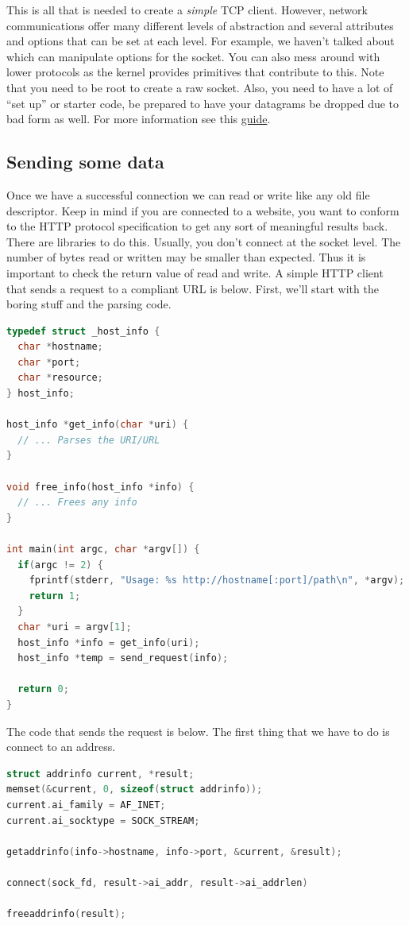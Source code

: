This is all that is needed to create a \textit{simple} TCP client.
However, network communications offer many different levels of abstraction and several attributes and options that can be set at each level.
For example, we haven't talked about  which can manipulate options for the socket.
You can also mess around with lower protocols as the kernel provides primitives that contribute to this.
Note that you need to be root to create a raw socket.
Also, you need to have a lot of ``set up'' or starter code, be prepared to have your datagrams be dropped due to bad form as well.
For more information see this \href{http://www.beej.us/guide/bgnet/output/html/multipage/getaddrinfoman.html}{guide}.

\subsection{Sending some data}

Once we have a successful connection we can read or write like any old file descriptor.
Keep in mind if you are connected to a website, you want to conform to the HTTP protocol specification to get any sort of meaningful results back.
There are libraries to do this.
Usually, you don't connect at the socket level.
The number of bytes read or written may be smaller than expected.
Thus it is important to check the return value of read and write.
A simple HTTP client that sends a request to a compliant URL is below.
First, we'll start with the boring stuff and the parsing code.

\begin{lstlisting}[language=C]
typedef struct _host_info {
  char *hostname;
  char *port;
  char *resource;
} host_info;

host_info *get_info(char *uri) {
  // ... Parses the URI/URL
}

void free_info(host_info *info) {
  // ... Frees any info
}

int main(int argc, char *argv[]) {
  if(argc != 2) {
    fprintf(stderr, "Usage: %s http://hostname[:port]/path\n", *argv);
    return 1;
  }
  char *uri = argv[1];
  host_info *info = get_info(uri);
  host_info *temp = send_request(info);

  return 0;
}
\end{lstlisting}

The code that sends the request is below.
The first thing that we have to do is connect to an address.

\begin{lstlisting}[language=C]
struct addrinfo current, *result;
memset(&current, 0, sizeof(struct addrinfo));
current.ai_family = AF_INET;
current.ai_socktype = SOCK_STREAM;

getaddrinfo(info->hostname, info->port, &current, &result);

connect(sock_fd, result->ai_addr, result->ai_addrlen)

freeaddrinfo(result);
\end{lstlisting}

